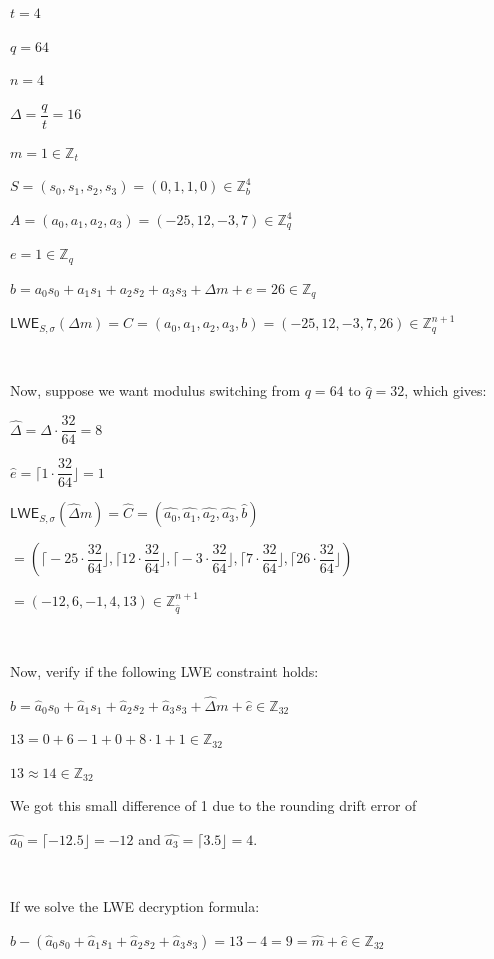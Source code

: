 $t = 4$

$q = 64$

$n = 4$

$\Delta = \dfrac{q}{t} = 16$

$m = 1 \in \mathbb{Z}_t$

$S = (s_0, s_1, s_2, s_3) = (0, 1, 1, 0) \in \mathbb{Z}_b^4$

$A = (a_0, a_1, a_2, a_3) = (-25, 12, -3, 7) \in \mathbb{Z}_q^4$

$e = 1 \in \mathbb{Z}_q$

$b = a_0s_0 + a_1s_1 + a_2s_2 + a_3s_3 + \Delta m + e = 26 \in \mathbb{Z}_q$

$\textsf{LWE}_{S, \sigma}(\Delta m) = C = (a_0, a_1, a_2, a_3, b) = (-25, 12, -3, 7, 26) \in \mathbb{Z}_q^{n+1}$

$ $

Now, suppose we want modulus switching from $q=64$ to $\hat{q} = 32$, which gives:

$\hat{\Delta} = \Delta\cdot\dfrac{32}{64} = 8$

$\hat{e} = \Big\lceil 1 \cdot \dfrac{32}{64} \Big\rfloor = 1$

$\textsf{LWE}_{S, \sigma}(\hat{\Delta} m) = \hat{C} = (\hat{a_0}, \hat{a_1}, \hat{a_2}, \hat{a_3}, \hat{b})$

$ = \left(\Big\lceil -25\cdot\dfrac{32}{64}\Big\rfloor, \Big\lceil12\cdot\dfrac{32}{64}\Big\rfloor, \Big\lceil-3\cdot\dfrac{32}{64}\Big\rfloor, \Big\lceil7\cdot\dfrac{32}{64}\Big\rfloor, \Big\lceil26\cdot\dfrac{32}{64}\Big\rfloor\right)$

$ = (-12, 6, -1, 4, 13) \in \mathbb{Z}_{\hat{q}}^{n+1}$

$ $

Now, verify if the following LWE constraint holds:

$\hat{b} = \hat{a}_0s_0 + \hat{a}_1s_1 + \hat{a}_2s_2 + \hat{a}_3s_3 + \hat{\Delta}m + \hat{e} \in \mathbb{Z}_{32}$

$13 = 0 + 6 - 1 + 0 + 8 \cdot 1 + 1 \in \mathbb{Z}_{32}$

$13 \approx 14 \in \mathbb{Z}_{32}$

We got this small difference of 1 due to the rounding drift error of 

$\hat {a_0} = \lceil -12.5 \rfloor = -12$ and $\hat{a_3} =  \lceil 3.5 \rfloor = 4$.

$ $

If we solve the LWE decryption formula:

$\hat b - (\hat{a}_0s_0 + \hat{a}_1s_1 + \hat{a}_2s_2 + \hat{a}_3s_3) = 13 - 4 = 9 = \hat m + \hat e \in \mathbb{Z}_{32}$


